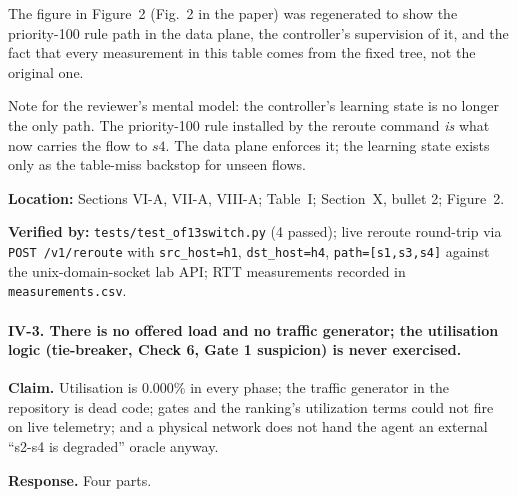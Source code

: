 \documentclass[11pt,a4paper]{article}
\begin{document}
The figure in Figure~2 (Fig.~2 in the paper) was regenerated to show the
priority-100 rule path in the data plane, the controller's supervision of it,
and the fact that every measurement in this table comes from the fixed tree,
not the original one.

Note for the reviewer's mental model: the controller's learning state is no
longer the only path. The priority-100 rule installed by the reroute command
\emph{is} what now carries the flow to $s4$. The data plane enforces it; the
learning state exists only as the table-miss backstop for unseen flows.

\textbf{Location:} Sections VI-A, VII-A, VIII-A; Table~I; Section~X, bullet 2;
Figure~2.

\textbf{Verified by:} \texttt{tests/test\_of13switch.py} (4 passed);
live reroute round-trip via \texttt{POST /v1/reroute} with \texttt{src\_host=h1},
\texttt{dst\_host=h4}, \texttt{path=[s1,s3,s4]} against the unix-domain-socket
lab API; RTT measurements recorded in \texttt{measurements.csv}.

\paragraph{IV-3. There is no offered load and no traffic generator; the
utilisation logic (tie-breaker, Check 6, Gate 1 suspicion) is never exercised.}

\textbf{Claim.} Utilisation is $0.000\%$ in every phase; the traffic
generator in the repository is dead code; gates and the ranking's utilization
terms could not fire on live telemetry; and a physical network does not
hand the agent an external ``s2-s4 is degraded'' oracle anyway.

\textbf{Response.} Four parts.
\end{document}
